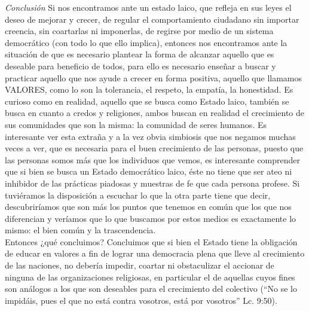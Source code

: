 \documentclass[12pt]{book} %
\begin{document}
\emph{Conclusión}
Si nos encontramos ante un estado laico, que refleja en sus leyes el deseo de mejorar y crecer, de regular el comportamiento ciudadano sin importar creencia, sin coartarlas ni imponerlas, de regirse por medio de un sistema democrático (con todo lo que ello implica), entonces nos encontramos ante la situación de que es necesario plantear la forma de alcanzar aquello que es deseable para beneficio de todos, para ello es necesario enseñar a buscar y practicar aquello que nos ayude a crecer en forma positiva, aquello que llamamos VALORES, como lo son la tolerancia, el respeto, la empatía, la honestidad. Es curioso como en realidad, aquello que se busca como Estado laico, también se busca en cuanto a credos y religiones, ambos buscan en realidad el crecimiento de sus comunidades que son la misma: la comunidad de seres humanos. Es interesante ver esta extraña y a la vez obvia simbiosis que nos negamos muchas veces a ver, que es necesaria para el buen crecimiento de las personas, puesto que las personas somos más que los individuos que vemos, es interesante comprender que si bien se busca un Estado democrático laico, éste no tiene que ser ateo ni inhibidor de las prácticas piadosas y muestras de fe que cada persona profese. Si tuviéramos la disposición a escuchar lo que la otra parte tiene que decir, descubriríamos que son más los puntos que tenemos en común que los que nos diferencian y veríamos que lo que buscamos por estos medios es exactamente lo mismo: el bien común y la trascendencia.\\

Entonces ¿qué concluimos? Concluimos que si bien el Estado tiene la obligación de educar en valores a fin de lograr una democracia plena que lleve al crecimiento de las naciones, no debería impedir, coartar ni obstaculizar el accionar de ninguna de las organizaciones religiosas, en particular el de aquellas cuyos fines son análogos a los que son deseables para el crecimiento del colectivo (“No se lo impidáis, pues el que no está contra vosotros, está por vosotros” Lc. 9:50).
\end{document}
